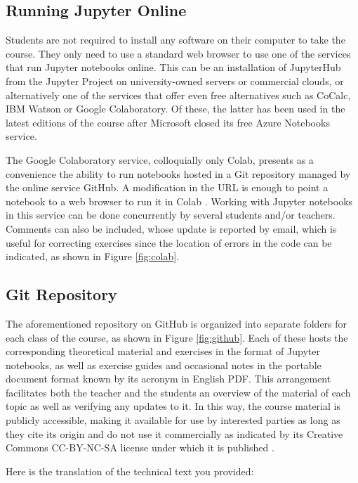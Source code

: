 \subsection{Running Jupyter Online}

Students are not required to install any software on their computer to take the course. They only need to use a standard web browser to use one of the services that run Jupyter notebooks online. This can be an installation of JupyterHub from the Jupyter Project on university-owned servers or commercial clouds, or alternatively one of the services that offer even free alternatives such as CoCalc, IBM Watson or Google Colaboratory. Of these, the latter has been used in the latest editions of the course after Microsoft closed its free Azure Notebooks service.

The Google Colaboratory service, colloquially only Colab, presents as a convenience the ability to run notebooks hosted in a Git repository managed by the online service GitHub. A modification in the URL is enough to point a notebook to a web browser to run it in Colab \cite{colab}. Working with Jupyter notebooks in this service can be done concurrently by several students and/or teachers. Comments can also be included, whose update is reported by email, which is useful for correcting exercises since the location of errors in the code can be indicated, as shown in Figure \ref{fig:colab}.

\subsection{Git Repository}

The aforementioned repository on GitHub is organized into separate folders for each class of the course, as shown in Figure \ref{fig:github}. Each of these hosts the corresponding theoretical material and exercises in the format of Jupyter notebooks, as well as exercise guides and occasional notes in the portable document format known by its acronym in English PDF. This arrangement facilitates both the teacher and the students an overview of the material of each topic as well as verifying any updates to it. In this way, the course material is publicly accessible, making it available for use by interested parties \cite{repositorio-victor} as long as they cite its origin and do not use it commercially as indicated by its Creative Commons CC-BY-NC-SA license under which it is published \cite{creative}.

Here is the translation of the technical text you provided:

